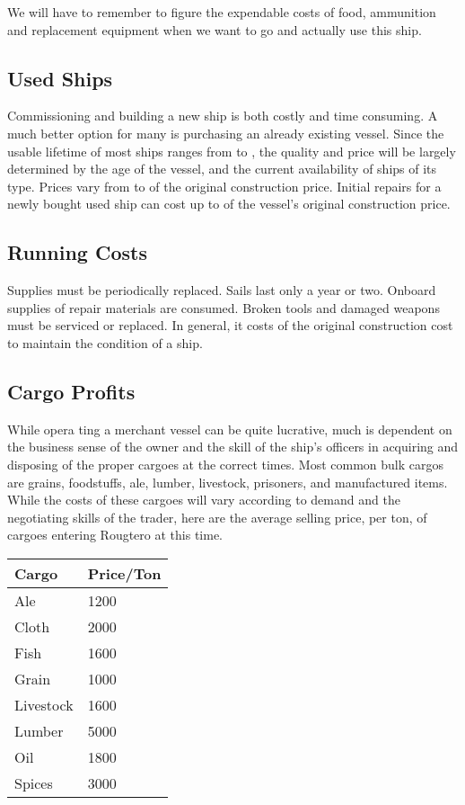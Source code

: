 \begin{multicols*}{2}
We will have to remember to figure the expendable costs of food, ammunition and replacement equipment when we want to go and actually use this ship.
\subsection{Used Ships}
Commissioning and building a new ship is both costly and time consuming. A much better option for many is purchasing an already existing vessel. Since the usable lifetime of most ships ranges from  to , the quality and price will be largely determined by the age of the vessel, and the current availability of ships of its type. Prices vary from  to  of the original construction price. Initial repairs for a newly bought used ship can cost up to  of the vessel’s original construction price.
\subsection{Running Costs}
Supplies must be periodically replaced. Sails last only a year or two. Onboard supplies of repair materials are consumed. Broken tools and damaged weapons must be serviced or replaced. In general, it costs  of the original construction cost  to maintain the condition of a ship.
\subsection{Cargo Profits}
While opera ting a merchant vessel can be quite lucrative, much is dependent on the business sense of the owner and the skill of the ship’s officers in acquiring and disposing of the proper cargoes at the correct times. Most common bulk cargos are grains, foodstuffs, ale, lumber,  livestock, prisoners, and manufactured items. While the costs of
these cargoes will vary according to demand and the negotiating skills of the trader, here are the average selling price, per ton, of cargoes entering Rougtero at this time.
\begin{normbox}
\small
\begin{tabular}{@{} l l}
\textbf{Cargo} & \textbf{Price/Ton}\\
\hline
Ale & 1200\\
Cloth & 2000\\
Fish & 1600\\
Grain & 1000\\
Livestock & 1600\\
Lumber & 5000\\
Oil & 1800\\
Spices & 3000\\
\end{tabular}
\end{normbox}

\end{multicols*}

